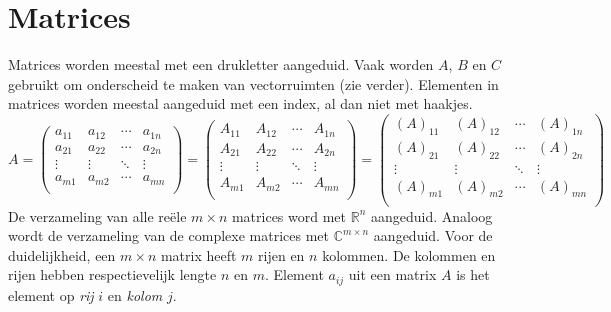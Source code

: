 \documentclass[lineaire_algebra_oplossingen.tex]{subfiles}
\begin{document}
\section{Matrices}
Matrices worden meestal met een drukletter aangeduid.
Vaak worden $A$, $B$ en $C$ gebruikt om onderscheid te maken van vectorruimten (zie verder). Elementen in matrices worden meestal aangeduid met een index, al dan niet met haakjes.
\[
A = 
\begin{pmatrix}
a_{11} & a_{12} & \cdots & a_{1n}\\
a_{21} & a_{22} & \cdots & a_{2n}\\
\vdots & \vdots & \ddots & \vdots\\
a_{m1} & a_{m2} & \cdots & a_{mn}\\
\end{pmatrix}
= 
\begin{pmatrix}
A_{11} & A_{12} & \cdots & A_{1n}\\
A_{21} & A_{22} & \cdots & A_{2n}\\
\vdots & \vdots & \ddots & \vdots\\
A_{m1} & A_{m2} & \cdots & A_{mn}\\
\end{pmatrix}
=
\begin{pmatrix}
(A)_{11} & (A)_{12} & \cdots & (A)_{1n}\\
(A)_{21} & (A)_{22} & \cdots & (A)_{2n}\\
\vdots & \vdots & \ddots & \vdots\\
(A)_{m1} & (A)_{m2} & \cdots & (A)_{mn}\\
\end{pmatrix}
\]
De verzameling van alle re\"ele $m\times n$ matrices word met $\mathbb{R}^n$ aangeduid.
Analoog wordt de verzameling van de complexe matrices met $\mathbb{C}^{m\times n}$ aangeduid.
Voor de duidelijkheid, een $m \times n$ matrix heeft $m$ rijen en $n$ kolommen.
De kolommen en rijen hebben respectievelijk lengte $n$ en $m$.
Element $a_{ij}$ uit een matrix $A$ is het element op \emph{rij} $i$ en \emph{kolom} $j$.
\end{document}
